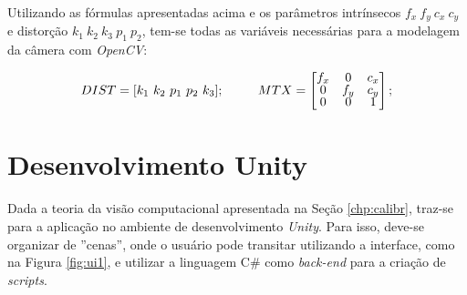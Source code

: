 Utilizando as fórmulas apresentadas acima e os parâmetros intrínsecos \(f_x \ f_y \ c_x \ c_y\) e distorção \(k_1 \ k_2 \ k_3 \ p_1 \ p_2\), tem-se todas as variáveis necessárias para a modelagem da câmera com \textit{OpenCV}:

\[ DIST = [ k_1 \ k_2 \ p_1 \ p_2 \ k_3 ]; \ \ \ \ \ \ \ \
MTX = 
\renewcommand\arraystretch{.8}
\begin{bmatrix}
    f_x & 0 & c_x \\
    0 & f_y & c_y \\
    0 & 0 & 1
\end{bmatrix};\]

\section{Desenvolvimento Unity}

Dada a teoria da visão computacional apresentada na Seção \ref{chp:calibr}, traz-se para a aplicação no ambiente de desenvolvimento \textit{Unity}. Para isso, deve-se organizar de ''cenas'', onde o usuário pode transitar utilizando a interface, como na Figura \ref{fig:ui1}, e utilizar a linguagem C\# como \textit{back-end} para a criação de \textit{scripts}.

